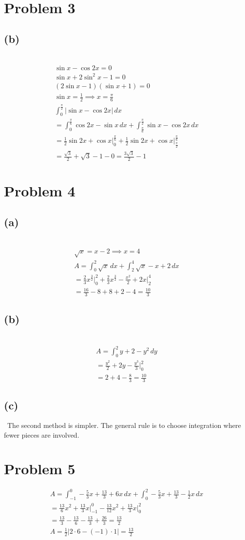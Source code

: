 \documentclass[12pt]{article}
\newcommand{\problem}[1]{\section{Problem #1}}
\newcommand{\subproblem}[1]{\subsection{(#1)} \,}
\begin{document}
\problem{3}

\subproblem{b}
\begin{gather*}
    \sin x -\cos 2x=0\\
    \sin x + 2\sin^2x -1=0\\
    (2\sin x -1)(\sin x+1)=0\\  
    \sin x=\frac{1}{2} \implies x=\frac{\pi}{6}\\
    \int_0^\frac{\pi}{2} |\sin x -\cos 2x| \, dx\\
    = \int_0^\frac{\pi}{6} \cos 2x -\sin x \,d x + \int_\frac{\pi}{6}^\frac{\pi}{2} \sin x -\cos 2x\, dx\\
    = \frac{1}{2}\sin 2x +\cos x \Big|_0^\frac{\pi}{6} + \frac{1}{2}\sin 2x+\cos x \Big|_\frac{\pi}{2}^\frac{\pi}{6}\\
    = \frac{\sqrt{3}}{2} + \sqrt{3} - 1 - 0 = \boxed{\frac{3\sqrt{3}}{2} -1}
\end{gather*}

\problem{4}

\subproblem{a}
\begin{gather*}
    \sqrt{x}=x-2 \implies x=4\\
    A=\int_0^2 \sqrt{x} \, dx + \int_2^4 \sqrt{x} -x+2\, dx\\
    = \frac{2}{3}x^\frac{3}{2}\Big|^2_0 + \frac{2}{3}x^\frac{3}{2} - \frac{x^2}{2}+2x\Big|^4_2\\
    = \frac{16}{3} -8 +8 + 2-4 = \boxed{\frac{10}{3}}
\end{gather*}

\subproblem{b}
\begin{gather*}
    A = \int_0^2 y+2-y^2\, dy\\
    = \frac{y^2}{2}+2y-\frac{y^3}{3} \Big|^2_0\\
    = 2+4- \frac{8}{3} = \boxed{\frac{10}{3}}
\end{gather*}

\subproblem{c}
The second method is simpler. The general rule is to choose integration where fewer pieces are involved.

\problem{5}
\begin{gather*}
    A=\int_{-1}^0 -\frac{5}{3}x+\frac{13}{3} + 6x\, dx + \int_0^2 -\frac{5}{3}x+\frac{13}{3} -\frac{1}{2}x\, dx\\
    = \frac{13}{6}x^2+\frac{13}{3}x\Big|^0_{-1} -\frac{13}{12}x^2 + \frac{13}{3}x\Big|_0^2\\
    = \frac{13}{3} - \frac{13}{6}  - \frac{13}{3} + \frac{26}{3} = \boxed{\frac{13}{2}}\\
    A=\frac{1}{2}|2 \cdot 6 - (-1)\cdot 1| = \boxed{\frac{13}{2}}
\end{gather*}
\end{document}
